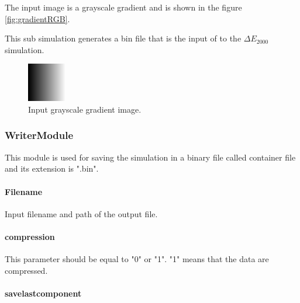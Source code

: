 The input image is a grayscale gradient and is shown in the figure \ref{fig:gradientRGB}.

This sub simulation generates a bin file that is the input of to the $\Delta{E_{2000}}$ simulation.

\begin{figure}[!htb]
\begin{center}
\includegraphics[width=0.5\columnwidth]{./04_DeltaE2000Module/images/24RGBL.png}
\caption{Input grayscale gradient image.}\label{fig:gradientRGBdeltaE}
\end{center}
\end{figure}

\subsubsection{WriterModule}

This module is used for saving the simulation in a binary file called container file and its extension is ".bin".

\paragraph{Filename}

Input filename and path of the output file.

\paragraph{compression}

This parameter should be equal to "0" or "1". "1" means that the data are compressed.

\paragraph{savelastcomponent}

